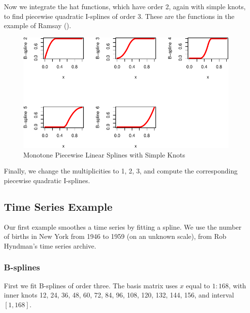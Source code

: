 \documentclass[
  12pt,
  letterpaper,
  DIV=11,
  numbers=noendperiod]{scrreprt}
\theoremstyle{remark}
\begin{document}
Now we integrate the hat functions, which have order 2, again with
simple knots, to find piecewise quadratic I-splines of order 3. These
are the functions in the example of Ramsay
().

\begin{figure}[H]

{\centering \includegraphics{splinical_files/figure-pdf/Iorder2mult1-1.pdf}

}

\caption{Monotone Piecewise Linear Splines with Simple Knots}

\end{figure}%

Finally, we change the multiplicities to 1, 2, 3, and compute the
corresponding piecewise quadratic I-splines.

\subsection{Time Series Example}\label{time-series-example}

Our first example smoothes a time series by fitting a spline. We use the
number of births in New York from 1946 to 1959 (on an unknown scale),
from Rob Hyndman's time series archive.

\subsubsection{B-splines}\label{b-splines}

First we fit B-splines of order three. The basis matrix uses \(x\) equal
to \(1:168\), with inner knots 12, 24, 36, 48, 60, 72, 84, 96, 108, 120,
132, 144, 156, and interval \([1,168]\).
\end{document}
